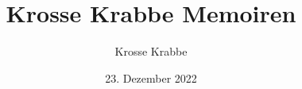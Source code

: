 \documentclass[a4paper]{book}
\begin{document}
\title{Krosse Krabbe Memoiren}
\author{Krosse Krabbe}
\date{23. Dezember 2022}

\maketitle
\tableofcontents


\end{document}
